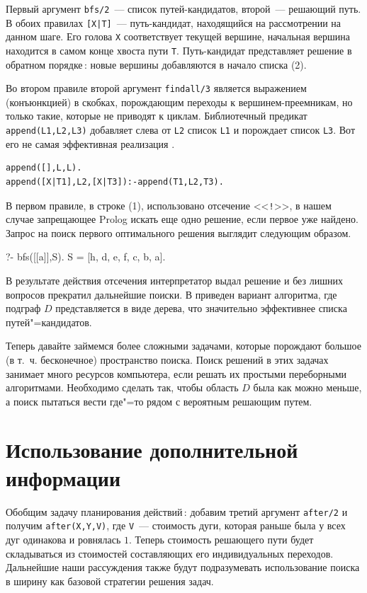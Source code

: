\documentclass[a4paper,14pt, openany, twoside, draft]{extbook} %
\begin{document}
Первый аргумент \texttt{bfs/2}~--- список путей-кандидатов, второй~--- решающий путь.  В обоих правилах \texttt{[X|T]}~--- путь-кандидат, находящийся на рассмотрении на данном шаге. Его голова \texttt{X} соответствует текущей вершине, начальная вершина находится в самом конце хвоста пути \texttt{T}.  Путь-кандидат представляет решение в обратном порядке\,: новые вершины добавляются в начало списка (2).

Во втором правиле второй аргумент \texttt{findall/3} является выражением (конъюнкцией) в скобках, порождающим переходы к вершинем-преемникам, но только такие, которые не приводят к циклам.  Библиотечный предикат \texttt{append(L1,L2,L3)} добавляет слева от \texttt{L2} список \texttt{L1} и порождает список \texttt{L3}.  Вот его не самая эффективная реализация \cite{Bratko}.

\begin{verbatim}
append([],L,L).
append([X|T1],L2,[X|T3]):-append(T1,L2,T3).
\end{verbatim}


В первом правиле, в строке (1), использовано отсечение <<\texttt{!}>>, в нашем случае запрещающее Prolog искать еще одно решение, если первое уже найдено.  Запрос на поиск первого оптимального решения выглядит следующим образом.

\begin{proexp}
?- bfs([[a]],S).
S = [h, d, e, f, c, b, a].
\end{proexp}

\noindent В результате действия отсечения интерпретатор выдал решение и без лишних вопросов прекратил дальнейшие поиски.  В \cite{Bratko} приведен вариант алгоритма, где подграф $D$ представляется в виде дерева, что значительно эффективнее списка путей"=кандидатов.

Теперь давайте займемся более сложными задачами, которые порождают большое (в т.~ч. бесконечное) пространство поиска.  Поиск решений в этих задачах занимает много ресурсов компьютера, если решать их простыми переборными алгоритмами.  Необходимо сделать так, чтобы область $D$ была как можно меньше, а поиск пытаться вести где"=то рядом с вероятным решающим путем.

\section{Использование дополнительной информации}
\label{sec:informedsearch}

Обобщим задачу планирования действий\,: добавим третий аргумент \texttt{after/2} и получим \texttt{after(X,Y,V)}, где \texttt{V}~--- стоимость дуги, которая раньше была у всех дуг одинакова и ровнялась $1$.   Теперь стоимость решающего пути будет складываться из стоимостей составляющих его индивидуальных переходов.  Дальнейшие наши рассуждения также будут подразумевать использование поиска в ширину как базовой стратегии решения задач.
\end{document}
